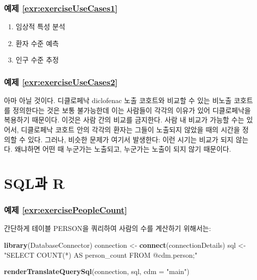 \documentclass[10.5pt]{book}
\newenvironment{Shaded}{\begin{snugshade}}{\end{snugshade}}
\newcommand{\KeywordTok}[1]{\textcolor[rgb]{0.13,0.29,0.53}{\textbf{#1}}}
\newcommand{\DataTypeTok}[1]{\textcolor[rgb]{0.13,0.29,0.53}{#1}}
\newcommand{\StringTok}[1]{\textcolor[rgb]{0.31,0.60,0.02}{#1}}
\newcommand{\NormalTok}[1]{#1}
\theoremstyle{definition}
\theoremstyle{definition}
\theoremstyle{definition}
\theoremstyle{remark}
\begin{document}
\subsubsection*{예제
\ref{exr:exerciseUseCases1}}\label{-refexrexerciseusecases1}

\begin{enumerate}
\def\labelenumi{\arabic{enumi}.}
\item
  임상적 특성 분석
\item
  환자 수준 예측
\item
  인구 수준 추정
\end{enumerate}

\subsubsection*{예제
\ref{exr:exerciseUseCases2}}\label{-refexrexerciseusecases2}

아마 아닐 것이다. 디클로페낙 diclofenac 노출 코호트와 비교할 수 있는
비노출 코호트를 정의한다는 것은 보통 불가능한데 이는 사람들이 각각의
이유가 있어 디클로페낙을 복용하기 때문이다. 이것은 사람 간의 비교를
금지한다. 사람 내 비교가 가능할 수는 있어서, 디클로페낙 코호트 안의
각각의 환자는 그들이 노출되지 않았을 때의 시간을 정의할 수 있다. 그러나,
비슷한 문제가 여기서 발생한다: 이런 시기는 비교가 되지 않는다. 왜냐하면
어떤 때 누군가는 노출되고, 누군가는 노출이 되지 않기 때문이다.

\section{SQL과 R}\label{SqlAndRanswers}

\subsubsection*{예제
\ref{exr:exercisePeopleCount}}\label{-refexrexercisepeoplecount}

간단하게 테이블 PERSON을 쿼리하여 사람의 수를 계산하기 위해서는:

\begin{Shaded}
\begin{Highlighting}[]
\KeywordTok{library}\NormalTok{(DatabaseConnector)}
\NormalTok{connection <-}\StringTok{ }\KeywordTok{connect}\NormalTok{(connectionDetails)}
\NormalTok{sql <-}\StringTok{ "SELECT COUNT(*) AS person_count}
\StringTok{FROM @cdm.person;"}

\KeywordTok{renderTranslateQuerySql}\NormalTok{(connection, sql, }\DataTypeTok{cdm =} \StringTok{"main"}\NormalTok{)}
\end{Highlighting}
\end{Shaded}
\end{document}
